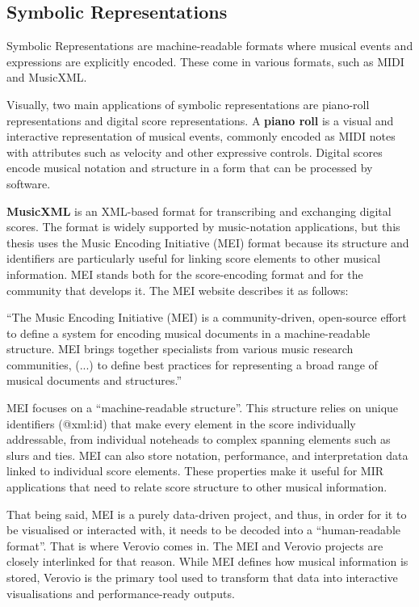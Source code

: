 \subsection{Symbolic Representations}

Symbolic Representations are machine-readable formats where musical events and expressions are explicitly encoded. These come in various formats, such as MIDI and MusicXML.

Visually, two main applications of symbolic representations are piano-roll representations and digital score representations. A \textbf{piano roll} is a visual and interactive representation of musical events, commonly encoded as MIDI notes with attributes such as velocity and other expressive controls. Digital scores encode musical notation and structure in a form that can be processed by software.

\textbf{MusicXML} is an XML-based format for transcribing and exchanging digital scores. The format is widely supported by music-notation applications, but this thesis uses the Music Encoding Initiative (MEI) format because its structure and identifiers are particularly useful for linking score elements to other musical information. MEI stands both for the score-encoding format and for the community that develops it. The MEI website describes it as follows:

``The Music Encoding Initiative (MEI) is a community-driven, open-source effort to define a system for encoding musical documents in a machine-readable structure. MEI brings together specialists from various music research communities, (...) to define best practices for representing a broad range of musical documents and structures.''\cite{MEI-Website}

MEI focuses on a ``machine-readable structure''. This structure relies on unique identifiers (@xml:id) that make every element in the score individually addressable, from individual noteheads to complex spanning elements such as slurs and ties. MEI can also store notation, performance, and interpretation data linked to individual score elements. These properties make it useful for MIR applications that need to relate score structure to other musical information.

That being said, MEI is a purely data-driven project, and thus, in order for it to be visualised or interacted with, it needs to be decoded into a ``human-readable format''. That is where Verovio comes in. The MEI and Verovio projects are closely interlinked for that reason. While MEI defines how musical information is stored, Verovio is the primary tool used to transform that data into interactive visualisations and performance-ready outputs.

